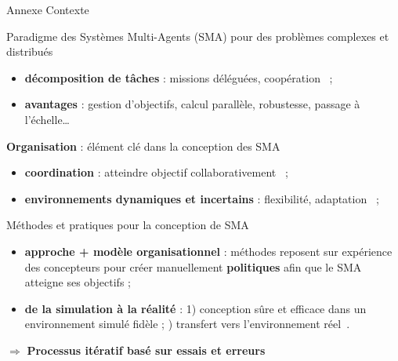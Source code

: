 \begin{frame}{Annexe}
    {Contexte}

    \begin{block}{Paradigme des Systèmes Multi-Agents (SMA) pour des problèmes complexes et distribués}
        \begin{itemize}
            \item \textbf{décomposition de tâches} : missions déléguées, coopération~\parencite{Raileanu2023} ;
            \item \textbf{avantages} : gestion d’objectifs, calcul parallèle, robustesse, passage à l’échelle\dots
        \end{itemize}
    \end{block}

    \begin{block}{\textbf{Organisation} : élément clé dans la conception des SMA}
        \begin{itemize}
            \item \textbf{coordination} : atteindre objectif collaborativement~\parencite{Hubner2007} ;
            \item \textbf{environnements dynamiques et incertains} : flexibilité, adaptation~\parencite{Kathleen2020} ;
        \end{itemize}
    \end{block}

    \begin{block}{Méthodes et pratiques pour la conception de SMA}
        \begin{itemize}
            \item \textbf{approche + modèle organisationnel} : méthodes reposent sur expérience des concepteurs pour créer manuellement \textbf{politiques} afin que le SMA atteigne ses objectifs ;
            \item \textbf{de la simulation à la réalité} : 1) conception sûre et efficace dans un environnement simulé fidèle ; ) transfert vers l’environnement réel~\parencite{Schon2021}.
        \end{itemize}
        \quad $\Longrightarrow$ \textbf{Processus itératif basé sur essais et erreurs}
    \end{block}

\end{frame}

